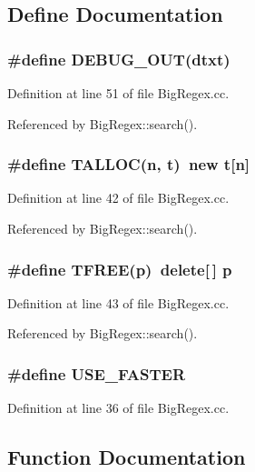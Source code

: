 \subsection{Define Documentation}
\subsubsection{\setlength{\rightskip}{0pt plus 5cm}\#define DEBUG\_\-OUT(dtxt)}\label{BigRegex_8cc_a3}




Definition at line 51 of file Big\-Regex.cc.

Referenced by Big\-Regex::search().
\subsubsection{\setlength{\rightskip}{0pt plus 5cm}\#define TALLOC(n, t)\ new t[n]}\label{BigRegex_8cc_a1}




Definition at line 42 of file Big\-Regex.cc.

Referenced by Big\-Regex::search().
\subsubsection{\setlength{\rightskip}{0pt plus 5cm}\#define TFREE(p)\ delete[$\,$] p}\label{BigRegex_8cc_a2}




Definition at line 43 of file Big\-Regex.cc.

Referenced by Big\-Regex::search().
\subsubsection{\setlength{\rightskip}{0pt plus 5cm}\#define USE\_\-FASTER}\label{BigRegex_8cc_a0}




Definition at line 36 of file Big\-Regex.cc.

\subsection{Function Documentation}
